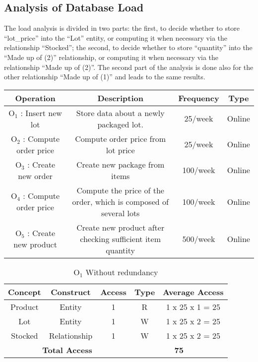 \newpage
\subsection{Analysis of Database Load}
The load analysis is divided in two parts: the first, to decide whether to store ``lot\_price'' into the ``Lot'' entity, or computing it when necessary via the relationship ``Stocked''; the second, to decide whether to store ``quantity'' into the ``Made up of (2)'' relationship, or computing it when necessary via the relationship ``Made up of (2)''. The second part of the analysis is done also for the other relationship ``Made up of (1)'' and leads to the same results.
\begin{table}[!h]
	\begin{center}
		\begin{tabular}{ | c | c | c | c | }
			\hline
			\textbf{Operation} & \textbf{Description} & \textbf{Frequency} & \textbf{Type} \\ \hline
			$ \textrm{O}_\textrm{1} $ : Insert new lot & Store data about a newly packaged lot. & 25/week & Online \\ \hline
			$ \textrm{O}_\textrm{2} $ : Compute order price  & Compute order price from lot price & 25/week & Online \\\hline
			$ \textrm{O}_\textrm{3} $ : Create new order & Create new package from items & 100/week & Online \\\hline
			$ \textrm{O}_\textrm{4} $ : Compute order price & Compute the price of the order, which is composed of several lots & 100/week & Online \\\hline
			$ \textrm{O}_\textrm{5} $ : Create new product & Create new product after checking sufficient item quantity & 500/week & Online \\\hline
		\end{tabular}
	\end{center}
\end{table}
\begin{table}[!h]\caption{	$ \textrm{O}_\textrm{1} $ Without redundancy}
	\begin{center}
		\begin{tabular}{| c | c | c | c | c |}
			\hline
			\textbf{Concept} & \textbf{Construct} & \textbf{Access} & \textbf{Type} & \textbf{Average Access} \\ \hline
			Product & Entity & 1 & R & 1 x 25 x 1 = 25 \\ \hline
			Lot & Entity & 1 & W & 1 x 25 x 2 = 25 \\ \hline
			Stocked & Relationship & 1 & W & 1 x 25 x 2 = 25 \\ \hline
			\multicolumn{3}{|c|}{\textbf{Total Access}} & \multicolumn{2}{|c|}{\textbf{75}} \\ \hline
		\end{tabular}
	\end{center}
\end{table}
